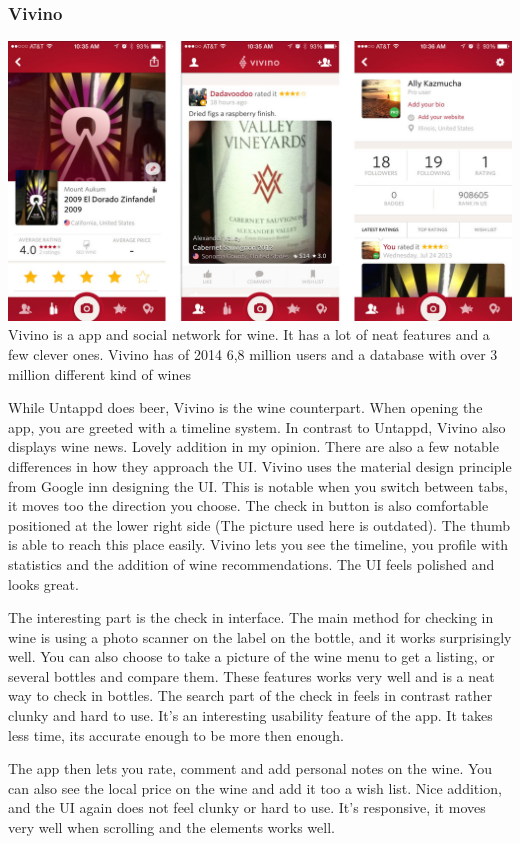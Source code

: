 \documentclass[12pt]{article}
\begin{document}
\subsubsection{Vivino}
\includegraphics[width=16cm]{pictures/vivino}
\bigbreak
Vivino is a app and social network for wine. It has a lot of neat features and a
few clever ones. Vivino has of 2014 6,8 million users and a database with over 3
million different kind of wines~\cite{vivino}

While Untappd does beer, Vivino is the wine counterpart. When opening the app,
you are greeted with a timeline system. In contrast to Untappd, Vivino also
displays wine news. Lovely addition in my opinion. There are also a few notable
differences in how they approach the UI. Vivino uses the material design
principle from Google inn designing the UI. This is notable when you switch
between tabs, it moves too the direction you choose. The check in button is also
comfortable positioned at the lower right side (The picture used here is
outdated). The thumb is able to reach this place easily. Vivino lets you see the
timeline, you profile with statistics and the addition of wine recommendations.
The UI feels polished and looks great. 

The interesting part is the check in interface. The main method for checking in
wine is using a photo scanner on the label on the bottle, and it works
surprisingly well. You can also choose to take a picture of the wine menu to get
a listing, or several bottles and compare them. These features works very well
and is a neat way to check in bottles. The search part of the check in feels in
contrast rather clunky and hard to use. It's an interesting usability feature of
the app. It takes less time, its accurate enough to be more then enough.

The app then lets you rate, comment and add personal notes on the wine. You can
also see the local price on the wine and add it too a wish list. Nice addition,
and the UI again does not feel clunky or hard to use. It's responsive, it moves
very well when scrolling and the elements works well.
\end{document}

